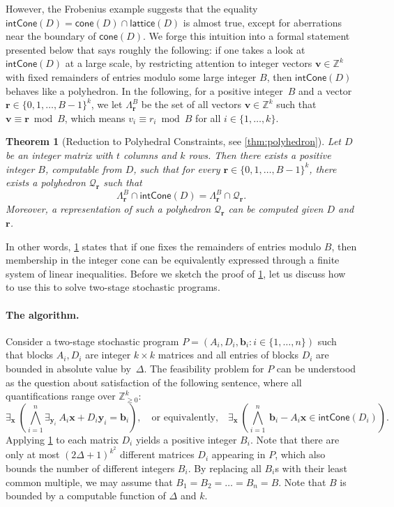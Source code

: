 \documentclass{article}
\newtheorem{theorem}{Theorem}\newtheorem{lemma}[theorem]{Lemma}\newtheorem{proposition}[theorem]{Proposition}\newtheorem{corollary}[theorem]{Corollary}\newtheorem{definition}[theorem]{Definition}\newtheorem{claim}[theorem]{Claim}\newtheorem{remark}[theorem]{Remark}\newtheorem{observation}[theorem]{Observation}\newtheorem{conjecture}[theorem]{Conjecture}\newtheorem{example}[theorem]{Example}
\renewcommand{\geq}{\geqslant}
\newcommand{\Z}{\mathbb{Z}}
\newcommand{\Zn}{\Z_{\geq 0}}
\newcommand{\tup}[1]{{\mathbf{#1}}}
\newcommand{\xx}{\tup x}
\newcommand{\yy}{\tup y}
\newcommand{\bb}{\tup b}
\newcommand{\rr}{\tup r}
\newcommand{\myvv}{\tup v} %
\newcommand{\Qq}{\mathcal{Q}}
\newcommand{\realcone}{\mathsf{cone}}
\newcommand{\intcone}{\mathsf{intCone}}
\newcommand{\lattice}{\mathsf{lattice}}
\begin{document}
However, the Frobenius example suggests that the equality $\intcone(D)=\realcone(D)\cap \lattice(D)$ is almost true, except for aberrations near the boundary of $\realcone(D)$. We forge this intuition into a formal statement presented below that says roughly the following: if one takes a look at $\intcone(D)$ at a large scale, by restricting attention to integer vectors $\myvv\in \Z^k$ with fixed remainders of entries modulo some large integer $B$, then $\intcone(D)$ behaves like a polyhedron. In the following, for a positive integer~$B$ and a vector $\rr\in \{0,1,\ldots,B-1\}^k$, we let $\Lambda_\rr^B$ be the set of all vectors $\myvv\in \Z^k$ such that $\myvv\equiv \rr\bmod B$, which means $v_i\equiv r_i\bmod B$ for all $i\in \{1,\ldots,k\}$.

\begin{theorem}[Reduction to Polyhedral Constraints, see \cref{thm:polyhedron}]\label{thm:reduction-overview}
Let $D$ be an integer matrix with $t$ columns and $k$ rows. Then there exists a positive integer $B$, computable from $D$, such that for every ${\rr\in \{0,1,\ldots,B-1\}^k}$, there exists a polyhedron $\Qq_\rr$ such that
$$\Lambda_\rr^B\cap \intcone(D) = \Lambda_\rr^B\cap \Qq_\rr.$$
Moreover, a representation of such a polyhedron $\Qq_\rr$ can be computed given $D$ and $\rr$.
\end{theorem}

In other words, \cref{thm:reduction-overview} states that if one fixes the remainders of entries modulo $B$, then membership in the integer cone can be equivalently expressed through a finite system of linear inequalities. Before we sketch the proof of \cref{thm:reduction-overview}, let us discuss how to use this to solve two-stage stochastic programs.

\paragraph*{The algorithm.} Consider a two-stage stochastic program $P=(A_i,D_i,\bb_i\colon i\in \{1,\ldots,n\})$ such that blocks $A_i,D_i$ are integer $k\times k$ matrices and all entries of blocks $D_i$ are bounded in absolute value by~$\Delta$. The feasibility problem for $P$ can be understood as the question about satisfaction of the following sentence, where all quantifications range over $\Zn^k$:
\begin{equation}\label{eq:hipopotam}
    \exists_{\xx}\ \left(\bigwedge_{i=1}^n \exists_{\yy_i}\  A_i\xx+D_i\yy_i = \bb_i\right),\quad\textrm{or equivalently,}\quad \exists_{\xx}\ \left(\bigwedge_{i=1}^n\ \bb_i-A_i\xx\in \intcone(D_i)\right).
\end{equation}
Applying \cref{thm:reduction-overview} to each matrix $D_i$ yields a positive integer $B_i$. Note that there are only at most $(2\Delta+1)^{k^2}$ different matrices $D_i$ appearing in $P$, which also bounds the number of different integers $B_i$. By replacing all $B_i$s with their least common multiple, we may assume that $B_1=B_2=\ldots=B_n=B$. Note that $B$ is bounded by a computable function of $\Delta$ and $k$.
\end{document}

